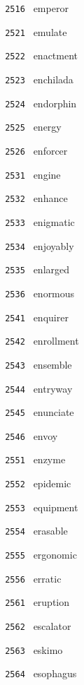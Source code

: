 \documentclass[11pt]{article}
\begin{document}
\begin{multicols}{6}
\noindent \texttt{ 2516 } emperor  \par
\vspace{3mm}
\noindent \texttt{ 2521 } emulate  \par
\noindent \texttt{ 2522 } enactment  \par
\noindent \texttt{ 2523 } enchilada  \par
\noindent \texttt{ 2524 } endorphin  \par
\noindent \texttt{ 2525 } energy  \par
\noindent \texttt{ 2526 } enforcer  \par
\vspace{3mm}
\noindent \texttt{ 2531 } engine  \par
\noindent \texttt{ 2532 } enhance  \par
\noindent \texttt{ 2533 } enigmatic  \par
\noindent \texttt{ 2534 } enjoyably  \par
\noindent \texttt{ 2535 } enlarged  \par
\noindent \texttt{ 2536 } enormous  \par
\vspace{3mm}
\noindent \texttt{ 2541 } enquirer  \par
\noindent \texttt{ 2542 } enrollment  \par
\noindent \texttt{ 2543 } ensemble  \par
\noindent \texttt{ 2544 } entryway  \par
\noindent \texttt{ 2545 } enunciate  \par
\noindent \texttt{ 2546 } envoy  \par
\vspace{3mm}
\noindent \texttt{ 2551 } enzyme  \par
\noindent \texttt{ 2552 } epidemic  \par
\noindent \texttt{ 2553 } equipment  \par
\noindent \texttt{ 2554 } erasable  \par
\noindent \texttt{ 2555 } ergonomic  \par
\noindent \texttt{ 2556 } erratic  \par
\vspace{3mm}
\noindent \texttt{ 2561 } eruption  \par
\noindent \texttt{ 2562 } escalator  \par
\noindent \texttt{ 2563 } eskimo  \par
\noindent \texttt{ 2564 } esophagus  \par

\end{multicols}
\end{document}
